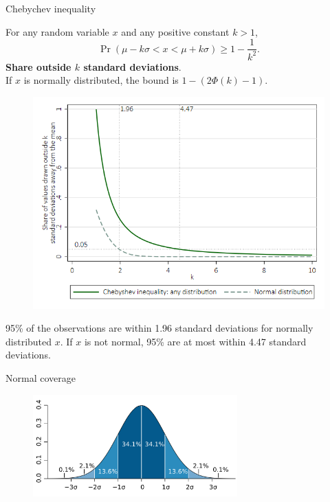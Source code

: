 \documentclass[11pt,table]{beamer}
\begin{document}
\begin{frame}{Chebychev inequality}

For any random variable $x$ and any positive constant $k>1$,
$$\Pr(\mu - k\sigma < x < \mu + k\sigma) \geq 1-\frac{1}{k^{2}}.$$
\footnotesize
\textbf{Share outside $k$ standard deviations}.\\
If $x$ is normally distributed, the bound is $1-(2\Phi(k)-1)$.
\begin{figure}[H]
\begin{center}
{\includegraphics[height=0.55\textheight]{figures/chebyshev_inequality_pdf}}\label{chebyshev_inequality_pdf}
\end{center}
\end{figure}
95\% of the observations are within 1.96 standard deviations for normally distributed $x$. If $x$ is not normal, 95\% are at most within 4.47 standard deviations.

\end{frame}


\begin{frame}{Normal coverage}
\begin{figure}
	\centering
		\includegraphics[width=0.70\textwidth]{figures/Standard_deviation_diagram.png}
	\label{fig:Standard_deviation_diagram}
\end{figure}

\end{frame}
\end{document}
